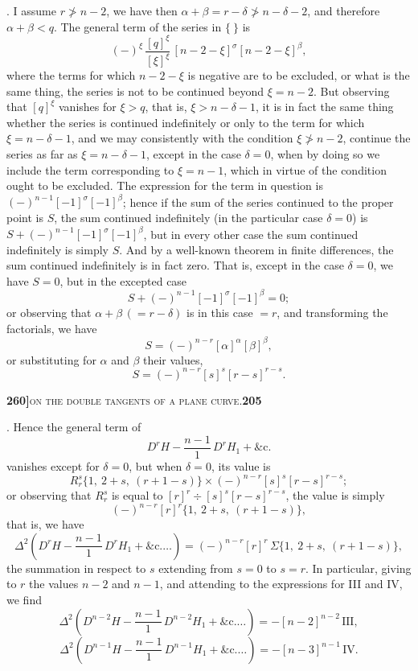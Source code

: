 \documentclass[11pt]{article}
\begin{document}
. I assume $r \not> n - 2$, we have then $\alpha + \beta = r - \delta \not> n - \delta - 2$, and therefore $\alpha + \beta < q$. The general term of the series in $\{\ \}$ is
\[
(-)^\xi\,\frac{[q]^\xi}{[\xi]^\xi}\,[n - 2 - \xi]^\sigma[n - 2 - \xi]^\beta,
\]
where the terms for which $n - 2 - \xi$ is negative are to be excluded, or what is the same thing, the series is not to be continued beyond $\xi = n - 2$. But observing that $[q]^\xi$ vanishes for $\xi > q$, that is, $\xi > n - \delta - 1$, it is in fact the same thing whether the series is continued indefinitely or only to the term for which $\xi = n - \delta - 1$, and we may consistently with the condition $\xi \not> n - 2$, continue the series as far as $\xi = n - \delta - 1$, except in the case $\delta = 0$, when by doing so we include the term corresponding to $\xi = n - 1$, which in virtue of the condition ought to be excluded. The expression for the term in question is $(-)^{n-1}[-1]^\sigma[-1]^\beta$; hence if the sum of the series continued to the proper point is $S$, the sum continued indefinitely (in the particular case $\delta = 0$) is $S + (-)^{n-1}[-1]^\sigma[-1]^\beta$, but in every other case the sum continued indefinitely is simply $S$. And by a well-known theorem in finite differences, the sum continued indefinitely is in fact zero. That is, except in the case $\delta = 0$, we have $S = 0$, but in the excepted case
\[
S + (-)^{n-1}[-1]^\sigma[-1]^\beta = 0;
\]
or observing that $\alpha + \beta\,(= r - \delta)$ is in this case $= r$, and transforming the factorials, we have
\[
S = (-)^{n-r}[\alpha]^\alpha[\beta]^\beta,
\]
or substituting for $\alpha$ and $\beta$ their values,
\[
S = (-)^{n-r}[s]^s[r-s]^{r-s}.
\]

\newpage

\noindent\textbf{260]}\hfill\textsc{on the double tangents of a plane curve.}\hfill\textbf{205}

\medskip

. Hence the general term of
\[
D^r H - \frac{n-1}{1}\,D^r H_1 + \&\text{c.}
\]
vanishes except for $\delta = 0$, but when $\delta = 0$, its value is
\[
R_r^s\{1,\ 2+s,\ (r+1-s)\} \times (-)^{n-r}[s]^s[r-s]^{r-s};
\]
or observing that $R_r^s$ is equal to $[r]^r \div [s]^s[r-s]^{r-s}$, the value is simply
\[
(-)^{n-r}[r]^r\{1,\ 2+s,\ (r+1-s)\},
\]
that is, we have
\[
\Delta^2\!\left(D^r H - \frac{n-1}{1}\,D^r H_1 + \&\text{c.}\ldots\right)
   = (-)^{n-r}[r]^r\,\Sigma\{1,\ 2+s,\ (r+1-s)\},
\]
the summation in respect to $s$ extending from $s = 0$ to $s = r$. In particular, giving to $r$ the values $n - 2$ and $n - 1$, and attending to the expressions for III and IV, we find
\[
\Delta^2\!\left(D^{n-2}H - \frac{n-1}{1}\,D^{n-2}H_1 + \&\text{c.}\ldots\right) = -[n-2]^{n-2}\,\mathrm{III},
\]
\[
\Delta^2\!\left(D^{n-1}H - \frac{n-1}{1}\,D^{n-1}H_1 + \&\text{c.}\ldots\right) = -[n-3]^{n-1}\,\mathrm{IV}.
\]
\end{document}

